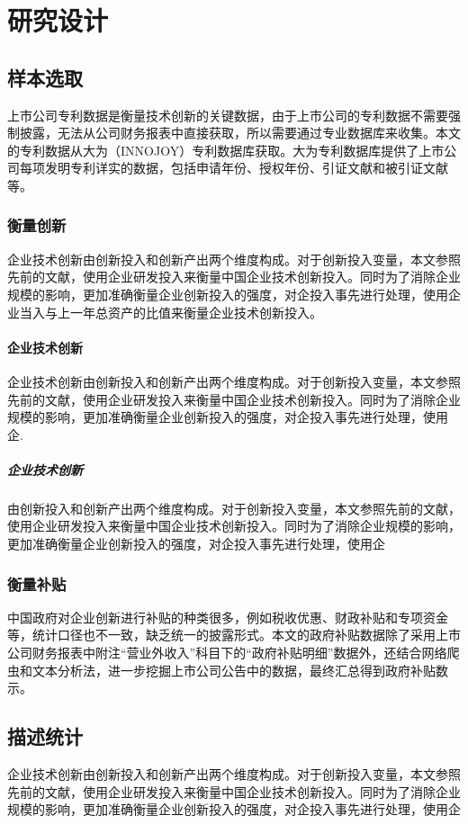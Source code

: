 \documentclass[UTF8]{ctexart} %
\begin{document}
\section{研究设计}
\subsection{样本选取}
上市公司专利数据是衡量技术创新的关键数据，由于上市公司的专利数据不需要强制披露，无法从公司财务报表中直接获取，所以需要通过专业数据库来收集。本文的专利数据从大为（INNOJOY）专利数据库获取。大为专利数据库提供了上市公司每项发明专利详实的数据，包括申请年份、授权年份、引证文献和被引证文献等。
\subsubsection{衡量创新}
企业技术创新由创新投入和创新产出两个维度构成。对于创新投入变量，本文参照先前的文献，使用企业研发投入来衡量中国企业技术创新投入。同时为了消除企业规模的影响，更加准确衡量企业创新投入的强度，对企投入事先进行处理，使用企业当入与上一年总资产的比值来衡量企业技术创新投入。
\paragraph{企业技术创新}
企业技术创新由创新投入和创新产出两个维度构成。对于创新投入变量，本文参照先前的文献，使用企业研发投入来衡量中国企业技术创新投入。同时为了消除企业规模的影响，更加准确衡量企业创新投入的强度，对企投入事先进行处理，使用企.
\subparagraph{企业技术创新}
由创新投入和创新产出两个维度构成。对于创新投入变量，本文参照先前的文献，使用企业研发投入来衡量中国企业技术创新投入。同时为了消除企业规模的影响，更加准确衡量企业创新投入的强度，对企投入事先进行处理，使用企
\subsubsection{衡量补贴}
中国政府对企业创新进行补贴的种类很多，例如税收优惠、财政补贴和专项资金等，统计口径也不一致，缺乏统一的披露形式。本文的政府补贴数据除了采用上市公司财务报表中附注“营业外收入”科目下的“政府补贴明细”数据外，还结合网络爬虫和文本分析法，进一步挖掘上市公司公告中的数据，最终汇总得到政府补贴数示。
\subsection{描述统计}
企业技术创新由创新投入和创新产出两个维度构成。对于创新投入变量，本文参照先前的文献，使用企业研发投入来衡量中国企业技术创新投入。同时为了消除企业规模的影响，更加准确衡量企业创新投入的强度，对企投入事先进行处理，使用企
\end{document}
